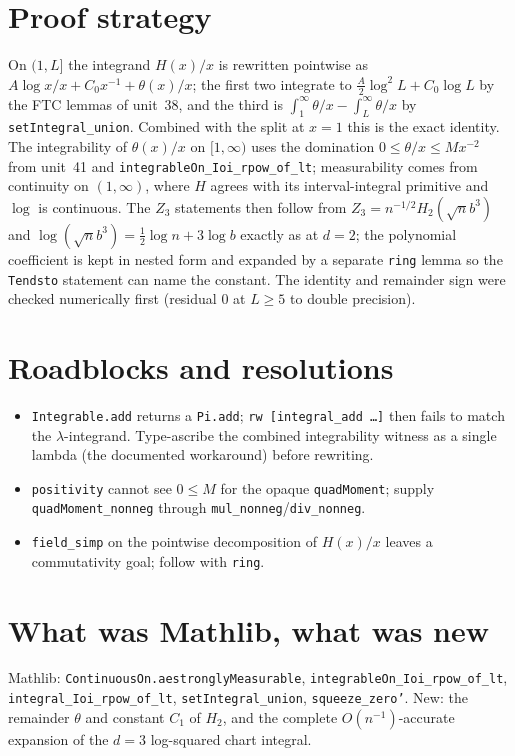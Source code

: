 \documentclass[11pt]{article}
\begin{document}
\section{Proof strategy}
On $(1,L]$ the integrand $H(x)/x$ is rewritten pointwise as
$A\log x/x+C_0x^{-1}+\theta(x)/x$; the first two integrate to $\tfrac A2\log^2L+C_0\log L$ by the
FTC lemmas of unit~38, and the third is $\int_1^\infty\theta/x-\int_L^\infty\theta/x$ by
\texttt{setIntegral\_union}. Combined with the split at $x=1$ this is the exact identity. The
integrability of $\theta(x)/x$ on $[1,\infty)$ uses the domination $0\le\theta/x\le Mx^{-2}$ from
unit~41 and \texttt{integrableOn\_Ioi\_rpow\_of\_lt}; measurability comes from continuity on
$(1,\infty)$, where $H$ agrees with its interval-integral primitive and $\log$ is continuous. The
$Z_3$ statements then follow from $Z_3=n^{-1/2}H_2(\sqrt nb^3)$ and
$\log(\sqrt nb^3)=\tfrac12\log n+3\log b$ exactly as at $d=2$; the polynomial coefficient is kept in
nested form and expanded by a separate \texttt{ring} lemma so the \texttt{Tendsto} statement can name
the constant. The identity and remainder sign were checked numerically first (residual $0$ at $L\ge5$
to double precision).

\section{Roadblocks and resolutions}
\begin{itemize}
\item \texttt{Integrable.add} returns a \texttt{Pi.add}; \texttt{rw [integral\_add …]} then fails to
match the $\lambda$-integrand. Type-ascribe the combined integrability witness as a single lambda
(the documented workaround) before rewriting.
\item \texttt{positivity} cannot see $0\le M$ for the opaque \texttt{quadMoment}; supply
\texttt{quadMoment\_nonneg} through \texttt{mul\_nonneg}/\texttt{div\_nonneg}.
\item \texttt{field\_simp} on the pointwise decomposition of $H(x)/x$ leaves a commutativity goal;
follow with \texttt{ring}.
\end{itemize}

\section{What was Mathlib, what was new}
Mathlib: \texttt{ContinuousOn.aestronglyMeasurable}, \texttt{integrableOn\_Ioi\_rpow\_of\_lt},
\texttt{integral\_Ioi\_rpow\_of\_lt}, \texttt{setIntegral\_union}, \texttt{squeeze\_zero'}. New: the
remainder $\theta$ and constant $C_1$ of $H_2$, and the complete $O(n^{-1})$-accurate expansion of the
$d=3$ log-squared chart integral.
\end{document}
